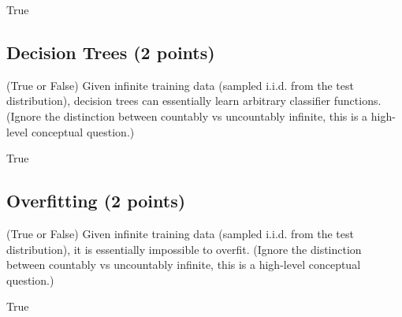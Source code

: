 \begin{solution}
True
\end{solution}

\subsection{Decision Trees (2 points)}

\question (True or False) Given infinite training data (sampled i.i.d. from the test distribution), decision trees can essentially learn arbitrary classifier functions. (Ignore the distinction between countably vs uncountably infinite, this is a high-level conceptual question.)

\begin{solution}
True
\end{solution}

\subsection{Overfitting (2 points)}
\question (True or False) Given infinite training data (sampled i.i.d. from the test distribution), it is essentially impossible to overfit. (Ignore the distinction between countably vs uncountably infinite, this is a high-level conceptual question.)

\begin{solution}
True
\end{solution}
